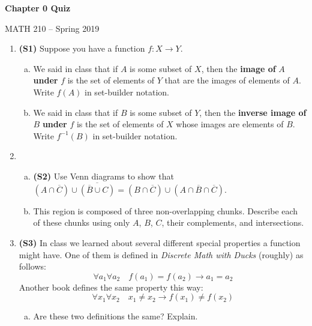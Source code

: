 \documentclass[12pt]{article}
\begin{document}
	\pagestyle{empty} %
	\begin{center}             %
	    {\Large\textbf{Chapter 0 Quiz}
	    
	    MATH 210 -- Spring 2019
	    } %
	\end{center}
	\begin{enumerate} %
		\item %
		\textbf{(S1)} Suppose you have a function $f:X\to Y$. 
		\begin{enumerate}[(a)] %
			\item We said in class that if $A$ is some subset of $X$, then the \textbf{image of} $A$ \textbf{under} $f$ is the set of elements of $Y$ that are the images of elements of $A$. Write $f(A)$ in set-builder notation.
			
			
			\item We said in class that if $B$ is some subset of $Y$, then the \textbf{inverse image of} $B$ \textbf{under} $f$ is the set of elements of $X$ whose images are elements of $B$. Write $f^{-1}(B)$ in set-builder notation.
		\end{enumerate} 
		
		\item %
		\begin{enumerate}[(a)]
			\item \textbf{(S2)}  Use Venn diagrams to show that 
			$\left(A\cap \overline{C}\right) \cup \overline{\left(\overline{B} \cup C\right)} = 
			\left(B\cap \overline{C}\right) \cup \left(A\cap \overline{B} \cap \overline{C} \right)$.
			
			\item This region is composed of three non-overlapping chunks. Describe each of these chunks using only $A$, $B$, $C$, their complements, and intersections.
		\end{enumerate}
	
		\item %
		\textbf{(S3)} In class we learned about several different special properties a function might have. One of them is defined in \textit{Discrete Math with Ducks} (roughly) as follows:
		\[\forall a_1 \forall a_2 \quad f(a_1) = f(a_2) \to a_1 = a_2 \]
		Another book defines the same property this way:
		\[\forall x_1 \forall x_2 \quad x_1 \neq x_2 \to f(x_1) \neq f(x_2) \]
		\begin{enumerate}[(a)]
			\item Are these two definitions the same? Explain.
			

\end{enumerate}
\end{enumerate}
\end{document}
